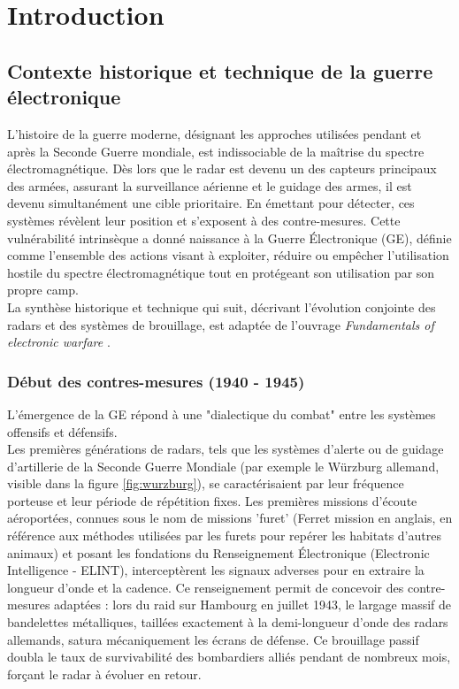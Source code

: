 \chapter{Introduction}
\section{Contexte historique et technique de la guerre électronique}
L'histoire de la guerre moderne, désignant les approches utilisées pendant et après la Seconde Guerre mondiale, est indissociable de la maîtrise du spectre électromagnétique. Dès lors que le radar est devenu un des capteurs principaux des armées, assurant la surveillance aérienne et le guidage des armes, il est devenu simultanément une cible prioritaire. En émettant pour détecter, ces systèmes révèlent leur position et s'exposent à des contre-mesures. Cette vulnérabilité intrinsèque a donné naissance à la Guerre Électronique (GE), définie comme l'ensemble des actions visant à exploiter, réduire ou empêcher l'utilisation hostile du spectre électromagnétique tout en protégeant son utilisation par son propre camp.\\

La synthèse historique et technique qui suit, décrivant l'évolution conjointe des radars et des systèmes de brouillage, est adaptée de l'ouvrage \textit{Fundamentals of electronic warfare} \cite{vakin_fundamentals_2001}. 

\subsection{Début des contres-mesures (1940 - 1945)} 
L'émergence de la GE répond à une "dialectique du combat" entre les systèmes offensifs et défensifs. \\

Les premières générations de radars, tels que les systèmes d'alerte ou de guidage d'artillerie de la Seconde Guerre Mondiale (par exemple le Würzburg allemand, visible dans la figure \ref{fig:wurzburg}), se caractérisaient par leur fréquence porteuse et leur période de répétition fixes. Les premières missions d'écoute aéroportées, connues sous le nom de missions 'furet' (Ferret mission en anglais, en référence aux méthodes utilisées par les furets pour repérer les habitats d'autres animaux) et posant les fondations du Renseignement Électronique (Electronic Intelligence - ELINT), interceptèrent les signaux adverses pour en extraire la longueur d'onde et la cadence. Ce renseignement permit de concevoir des contre-mesures adaptées : lors du raid sur Hambourg en juillet 1943, le largage massif de bandelettes métalliques, taillées exactement à la demi-longueur d'onde des radars allemands, satura mécaniquement les écrans de défense. Ce brouillage passif doubla le taux de survivabilité des bombardiers alliés pendant de nombreux mois, forçant le radar à évoluer en retour.

